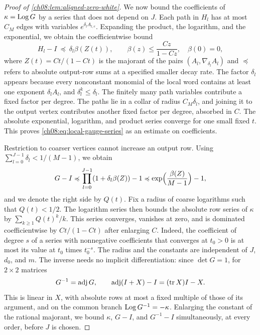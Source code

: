 \begin{proof}[Proof of \cref{ch08:lem:aligned-zero-white}]
We now bound the coefficients of $\kappa=\operatorname{Log} G$ by a series that does not depend on $J$. Each path in $H_l$ has at most $C_M$ edges with variables $e^{\delta_lA_{l,e}}$. Expanding the product, the logarithm, and the exponential, we obtain the coefficientwise bound
\begin{equation}\label{ch08:eq:local-gauge-series}
 H_l-I\ \preccurlyeq\ \delta_l\beta(Z(t)),\qquad
          \beta(z)\le\frac{Cz}{1-Cz},\quad \beta(0)=0,
\end{equation}
where $Z(t)=Ct/(1-Ct)$ is the majorant of the pairs $(A_l,\nabla_{\delta_l}A_l)$ and $\preccurlyeq$ refers to absolute output-row sums at a specified smaller decay rate. The factor $\delta_l$ appears because every nonconstant monomial of the local word contains at least one exponent $\delta_lA_l$, and $\delta_l^k\le\delta_l$. The finitely many path variables contribute a fixed factor per degree. The paths lie in a collar of radius $C_M\delta_l$, and joining it to the output vertex contributes another fixed factor per degree, absorbed in $C$. The absolute exponential, logarithm, and product series converge for one small fixed $t$. This proves \eqref{ch08:eq:local-gauge-series} as an estimate on coefficients.

Restriction to coarser vertices cannot increase an output row. Using $\sum_{l=0}^{J-1}\delta_l<1/(M-1)$, we obtain
\[
 G-I\preccurlyeq\prod_{l=0}^{J-1}(1+\delta_l\beta(Z))-1
 \preccurlyeq \exp\Bigl(\frac{\beta(Z)}{M-1}\Bigr)-1,
\]
and we denote the right side by $Q(t)$.
Fix a radius of coarse logarithms such that $Q(t)<1/2$. The logarithm series then bounds the absolute row series of $\kappa$ by $\sum_{k\ge1}Q(t)^k/k$. This series converges, vanishes at zero, and is dominated coefficientwise by $Ct/(1-Ct)$ after enlarging $C$. Indeed, the coefficient of degree $s$ of a series with nonnegative coefficients that converges at $t_0>0$ is at most its value at $t_0$ times $t_0^{-s}$. The radius and the constants are independent of $J$, $d_0$, and $m$. The inverse needs no implicit differentiation: since $\det G=1$, for $2\times2$ matrices
\begin{equation}\label{ch08:eq:terminal-gauge-inverse}
 G^{-1}=\operatorname{adj}G,\qquad
 \operatorname{adj}(I+X)-I=(\operatorname{tr} X)I-X.
\end{equation}
This is linear in $X$, with absolute rows at most a fixed multiple of those of its argument, and on the common branch $\operatorname{Log} G^{-1}=-\kappa$. Enlarging the constant of the rational majorant, we bound $\kappa$, $G-I$, and $G^{-1}-I$ simultaneously, at every order, before $J$ is chosen.


\end{proof}
